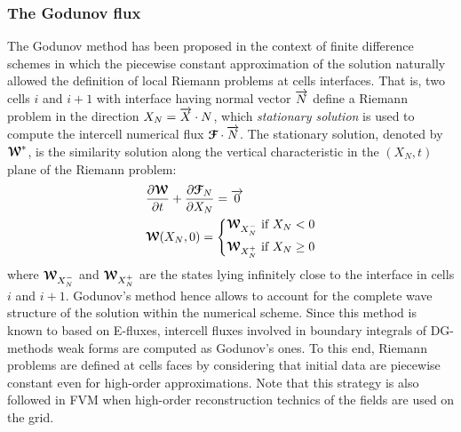 \subsubsection*{The Godunov flux}
The Godunov method \cite{Godunov_method} has been proposed in the context of finite difference schemes in which the piecewise constant approximation of the solution naturally allowed the definition of local Riemann problems at cells interfaces. That is, two cells $i$ and $i+1$ with interface having normal vector ${\overrightarrow{N}}$ define a Riemann problem in the direction $X_N={\overrightarrow{X}}\cdot{N}$, which \textit{stationary solution} is used to compute the intercell numerical flux ${\boldsymbol{\mathcal{F}}} \cdot {\overrightarrow{N}}$. The stationary solution, denoted by ${\boldsymbol{\mathcal{W}}}^*$, is the similarity solution along the vertical characteristic in the $(X_N,t)$ plane of the Riemann problem:
\begin{equation}
  \label{eq:RP_mesh}
  \begin{aligned}
    &\frac{\partial {\boldsymbol{\mathcal{W}}}}{\partial t} + \frac{\partial {\boldsymbol{\mathcal{F}}}_N}{\partial X_N} = {\overrightarrow{0}}  \\
    & {\boldsymbol{\mathcal{W}}}(X_N,0)= \left\lbrace 
      \begin{aligned}
        & {\boldsymbol{\mathcal{W}}}_{X_N^-} \text{ if } X_N <0 \\
        & {\boldsymbol{\mathcal{W}}}_{X_N^{+}} \text{ if } X_N \geq 0
      \end{aligned}
        \right.
  \end{aligned}
\end{equation}
where ${\boldsymbol{\mathcal{W}}}_{X_N^-}$ and ${\boldsymbol{\mathcal{W}}}_{X_N^{+}}$ are the states lying infinitely close to the interface in cells $i$ and $i+1$. 
Godunov's method hence allows to account for the complete wave structure of the solution within the numerical scheme. Since this method is known to based on E-fluxes, intercell fluxes involved in boundary integrals of DG-methods weak forms are computed as Godunov's ones. To this end, Riemann problems are defined at cells faces by considering that initial data are piecewise constant even for high-order approximations. Note that this strategy is also followed in FVM when high-order reconstruction technics of the fields are used on the grid.


